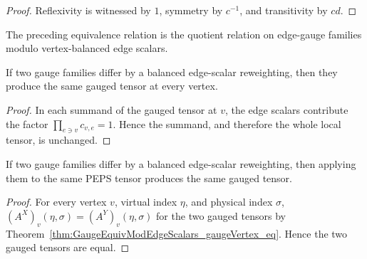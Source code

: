 \begin{proof}\leanok
    Reflexivity is witnessed by $1$, symmetry by $c^{-1}$, and transitivity
    by $cd$.
\end{proof}

\begin{definition}%
    \label{def:GaugeEquivModEdgeScalars_setoid}
    \leanok
    The preceding equivalence relation is the quotient relation on edge-gauge
    families modulo vertex-balanced edge scalars.
\end{definition}

\begin{theorem}%
    \label{thm:GaugeEquivModEdgeScalars_gaugeVertex_eq}
    \leanok
    If two gauge families differ by a balanced edge-scalar reweighting, then
    they produce the same gauged tensor at every vertex.
\end{theorem}

\begin{proof}\leanok{}
    In each summand of the gauged tensor at $v$, the edge scalars contribute
    the factor $\prod_{e\ni v}c_{v,e}=1$. Hence the summand, and therefore
    the whole local tensor, is unchanged.
\end{proof}

\begin{theorem}%
    \label{thm:GaugeEquivModEdgeScalars_applyGauge_eq}
    \leanok
    If two gauge families differ by a balanced edge-scalar reweighting, then
    applying them to the same PEPS tensor produces the same gauged tensor.
    \begin{center}
        \TNPEPSGaugeVertexAction
    \end{center}
\end{theorem}

\begin{proof}\leanok
    For every vertex $v$, virtual index $\eta$, and physical index $\sigma$,
    $(A^X)_v(\eta,\sigma)=(A^Y)_v(\eta,\sigma)$ for the two gauged tensors by
    Theorem~\ref{thm:GaugeEquivModEdgeScalars_gaugeVertex_eq}. Hence the
    two gauged tensors are equal.
\end{proof}

